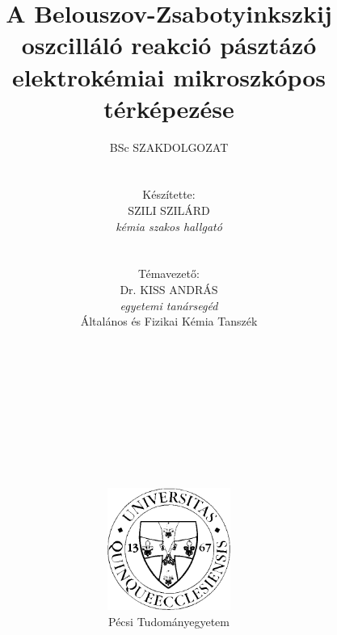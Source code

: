 \pagestyle{empty}

\title{\textbf{A Belouszov-Zsabotyinkszkij oszcilláló reakció pásztázó elektrokémiai mikroszkópos térképezése}}

\author{BSc SZAKDOLGOZAT\\
\\ \\ Készítette:\\ 
SZILI SZILÁRD \\
\emph{kémia szakos hallgató}\\
\\ \\
Témavezető: \\
Dr. KISS ANDRÁS \\
\emph{egyetemi tanársegéd} \\
Általános és Fizikai Kémia Tanszék \\
\\ \\ \\ \\ \\ \\ \\ \\ \\ \\
\includegraphics[width=0.3\textwidth]{img/pte_logo.eps} \\
Pécsi Tudományegyetem}
\maketitle
\pagestyle{plain}

\large
\setcounter{tocdepth}{4}
\tableofcontents
